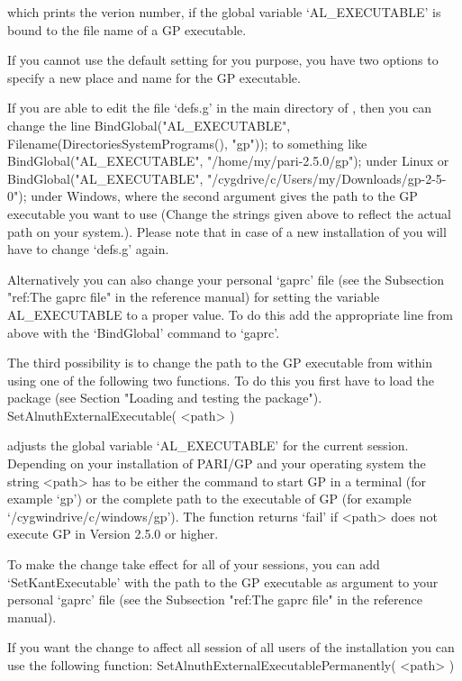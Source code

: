 which prints the verion number, if the global variable `AL_EXECUTABLE'
is bound to the file name of a GP executable.

If you cannot use the default setting for you purpose, you have
two options to specify a new place and name for the GP executable.

If you are able to edit the file `defs.g' in the main directory of
{\Alnuth}, then you can change the line 
\beginexample
    BindGlobal("AL_EXECUTABLE", Filename(DirectoriesSystemPrograms(), "gp"));
\endexample
to something like
\beginexample
    BindGlobal("AL_EXECUTABLE", "/home/my/pari-2.5.0/gp");
\endexample 
under Linux or
\beginexample
    BindGlobal("AL_EXECUTABLE", "/cygdrive/c/Users/my/Downloads/gp-2-5-0");
\endexample 
under Windows, where the second argument gives the path to the GP
executable you want to use (Change the strings given above to reflect
the actual path on your system.). Please note that in case of a new
installation of {\Alnuth} you will have to change `defs.g' again. 

Alternatively you can also change your personal `gaprc' file (see 
the Subsection "ref:The gaprc file" in the {\GAP} reference manual)
for setting the variable AL_EXECUTABLE to a proper value. To do this
add the appropriate line from above with the `BindGlobal' command to
`gaprc'.

The third possibility is to change the path to the GP executable from
within {\GAP} using one of the following two functions. To do this you
first have to load the package (see Section "Loading and testing the
package").
\> SetAlnuthExternalExecutable( <path> )

adjusts the global variable `AL_EXECUTABLE' for the current {\GAP}
session. Depending on your installation of PARI/GP and your operating
system the string <path> has to be either the command to start GP in a
terminal (for example `gp') or the complete path to the executable of GP 
(for example `/cygwindrive/c/windows/gp'). The function returns `fail'
if <path> does not execute GP in Version 2.5.0 or higher.

To make the change take effect for all of your {\GAP} sessions, you can
add `SetKantExecutable' with the path to the GP executable as argument
to your personal `gaprc' file (see the Subsection "ref:The gaprc file"
in the {\GAP} reference manual). 

If you want the change to affect all {\GAP} session of all users of the
{\GAP} installation you can use the following function:
\> SetAlnuthExternalExecutablePermanently( <path> )

